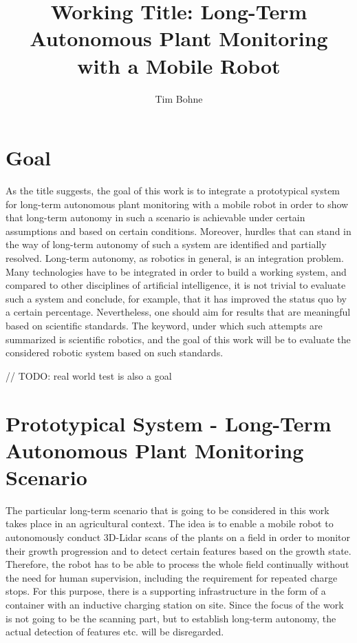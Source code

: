 \documentclass[german, master, expose, latin1]{base/thesis_KBS}
\begin{document}
\title{Working Title: Long-Term Autonomous Plant Monitoring with a Mobile Robot}
\author{Tim Bohne}

\generatetitle

\section{Goal}

As the title suggests, the goal of this work is to integrate a prototypical system for long-term autonomous plant monitoring with a mobile robot
in order to show that long-term autonomy in such a scenario is achievable under certain assumptions and based on certain conditions.
Moreover, hurdles that can stand in the way of long-term autonomy of such a system are identified and partially resolved.
Long-term autonomy, as robotics in general, is an integration problem. Many technologies have to be integrated in order to build a working system, and compared to
other disciplines of artificial intelligence, it is not trivial to evaluate such a system and conclude, for example, that it has improved the status quo by a certain percentage.
Nevertheless, one should aim for results that are meaningful based on scientific standards. The keyword, under which such attempts are summarized is scientific robotics,
and the goal of this work will be to evaluate the considered robotic system based on such standards.

// TODO: real world test is also a goal

\section{Prototypical System - Long-Term Autonomous Plant Monitoring Scenario}

The particular long-term scenario that is going to be considered in this work takes place in an agricultural context.
The idea is to enable a mobile robot to autonomously conduct 3D-Lidar scans of the plants on a field in order to monitor their growth progression and 
to detect certain features based on the growth state. Therefore, the robot has to be able to process the whole field continually without the need for human supervision,
including the requirement for repeated charge stops. For this purpose, there is a supporting infrastructure in the form of a container with an inductive charging station on site.
Since the focus of the work is not going to be the scanning part, but to establish long-term autonomy, the actual detection of features etc. will be disregarded.\newline
\end{document}

